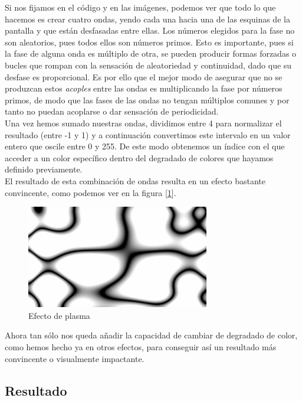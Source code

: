 Si nos fijamos en el código y en las imágenes, podemos ver que todo lo que hacemos es crear cuatro ondas, yendo cada una hacia una de las esquinas de la pantalla y que están desfasadas entre ellas. Los números elegidos para la fase no son aleatorios, pues todos ellos son números primos. Esto es importante, pues si la fase de alguna onda es múltiplo de otra, se pueden producir formas forzadas o bucles que rompan con la sensación de aleatoriedad y continuidad, dado que su desfase es proporcional. Es por ello que el mejor modo de asegurar que no se produzcan estos \emph{acoples} entre las ondas es multiplicando la fase por números primos, de modo que las fases de las ondas no tengan múltiplos comunes y por tanto no puedan acoplarse o dar sensación de periodicidad.\\  

Una vez hemos sumado nuestras ondas, dividimos entre 4 para normalizar el resultado (entre -1 y 1) y a continuación convertimos este intervalo en un valor entero que oscile entre 0 y 255. De este modo obtenemos un índice con el que acceder a un color específico dentro del degradado de colores que hayamos definido previamente.\\

El resultado de esta combinación de ondas resulta en un efecto bastante convincente, como podemos ver en la figura [\ref{fig:whiteplasma}].\\

\begin{figure}[h]
	\centering
	\includegraphics[width=8cm]{archivos/whiteplasma}
	\caption{Efecto de plasma}
	\label{fig:whiteplasma}
\end{figure}

Ahora tan sólo nos queda añadir la capacidad de cambiar de degradado de color, como hemos hecho ya en otros efectos, para conseguir así un resultado más convincente o visualmente impactante.

\subsection{Resultado}

